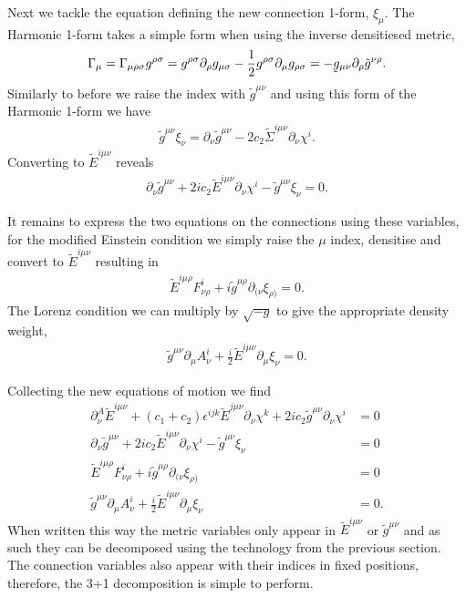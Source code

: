 \documentclass[10pt]{report}
\newcommand{\utilde}[1]{\underaccent{\tilde}{#1}}
\theoremstyle{definition}
\newcommand{\tE}[0]{\tilde{E}}
\newcommand{\tg}[0]{\tilde{g}}
\newcommand{\tsd}[0]{\tilde{\Sigma}}
\begin{document}
    Next we tackle the equation defining the new connection 1-form, $\xi_\mu$. The Harmonic 1-form takes a simple form when using the inverse densitiesed metric,
    \begin{align}
        \Gamma_\mu = \Gamma_{\mu\rho\sigma} g^{\rho\sigma} = g^{\rho\sigma} \partial_\rho g_{\mu\sigma} - \frac{1}{2} g^{\rho\sigma} \partial_\mu g_{\rho\sigma} = - \utilde{g}_{\mu\nu} \partial_\rho \tg^{\nu\rho}.
    \end{align}
    Similarly to before we raise the index with $\tg^{\mu\nu}$ and using this form of the Harmonic 1-form we have 
    \begin{align}
        \tg^{\mu\nu} \xi_\nu = \partial_\nu \tg^{\mu\nu} - 2c_2 \tsd^{i\mu\nu} \partial_\nu \chi^i.
    \end{align}
    Converting to $\tE^{i\mu\nu}$ reveals 
    \begin{align}
        \partial_\nu \tg^{\mu\nu} + 2ic_2 \tE^{i\mu\nu} \partial_\nu \chi^i - \tg^{\mu\nu} \xi_\nu = 0.
    \end{align}

    It remains to express the two equations on the connections using these variables, for the modified Einstein condition we simply raise the $\mu$ index, densitise and convert to $\tE^{i\mu\nu}$ resulting in 
    \begin{align}
        \tE^{i\mu\rho} F^i_{\nu\rho} + i \tg^{\mu\rho} \partial_{(\nu} \xi_{\rho)} = 0.
    \end{align}
    The Lorenz condition we can multiply by $\sqrt{-g}$ to give the appropriate density weight, 
    \begin{align}
        \tg^{\mu\nu} \partial_\mu A^i_\nu + \frac{i}{2} \tE^{i\mu\nu} \partial_\mu \xi_\nu = 0.
    \end{align}
    
    Collecting the new equations of motion we find 
    \begin{align}
        \partial^A_\nu \tE^{i\mu\nu} + (c_1 + c_2) \epsilon^{ijk} \tE^{j\mu\nu} \partial_\nu \chi^k + 2 i c_2 \tg^{\mu\nu} \partial_\nu \chi^i & = 0 \label{eq:num-plebanski-connection-definition-components}\\
        \partial_\nu \tg^{\mu\nu} + 2ic_2 \tE^{i\mu\nu} \partial_\nu \chi^i - \tg^{\mu\nu} \xi_\nu & = 0 \label{eq:num-plebanski-harmonic-definition-components}\\
        \tE^{i\mu\rho} F^i_{\nu\rho} + i \tg^{\mu\rho} \partial_{(\nu} \xi_{\rho)} & = 0\label{eq:num-plebanski-einstein-condition-components}\\
        \tg^{\mu\nu} \partial_\mu A^i_\nu + \frac{i}{2} \tE^{i\mu\nu} \partial_\mu \xi_\nu & = 0. \label{eq:num-plebanski-lorenz-gauge-components}
    \end{align}
    When written this way the metric variables only appear in $\tE^{i\mu\nu}$ or $\tg^{\mu\nu}$ and as such they can be decomposed using the technology from the previous section. The connection variables also appear with their indices in fixed positions, therefore, the 3+1 decomposition is simple to perform.
\end{document}
